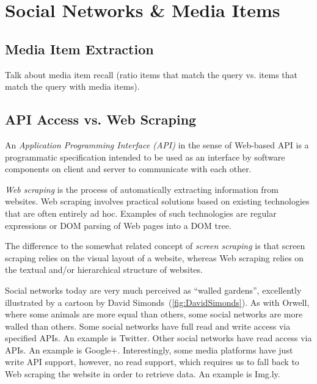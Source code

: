 \documentclass{acm_proc_article-sp}
\let\oldemph\emph
\renewcommand{\emph}[1]{\oldemph{\fontsize{9}{9}\selectfont #1}}
\begin{document}
\section{Social Networks \& Media Items}

\subsection{Media Item Extraction}
Talk about media item recall (ratio items that match the query vs. items that match the query with media items).

\subsection{API Access vs. Web Scraping}
An \emph{Application Programming Interface (API)} in the sense of Web-based API is a programmatic specification intended to be used as an interface by software components on client and server to communicate with each other.

\emph{Web scraping} is the process of automatically extracting information from websites.
Web scraping involves practical solutions based on existing technologies that are often entirely ad hoc.
Examples of such technologies are regular expressions or DOM parsing of Web pages into a DOM tree.

The difference to the somewhat related concept of \emph{screen scraping} is that screen scraping relies on the visual layout of a website, whereas Web scraping relies on the textual and/or hierarchical structure of websites.

Social networks today are very much perceived as ``walled gardens'', excellently illustrated by a cartoon by David Simonds~(\autoref{fig:DavidSimonds}).
As with Orwell, where some animals are more equal than others, some social networks are more walled than others.
Some social networks have full read and write access via specified APIs.
An example is Twitter.
Other social networks have read access via APIs.
An example is Google+.
Interestingly, some media platforms have just write API support, however, no read support, which requires us to fall back to Web scraping the website in order to retrieve data.
An example is Img.ly.
\end{document}
